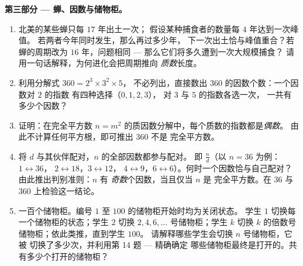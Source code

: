 \begin{problem}
\medskip
\noindent\textbf{第三部分 --- 蝉、因数与储物柜。}
\begin{enumerate}[resume]
  \item 北美的某些蝉只每 $17$ 年出土一次；
        假设某种捕食者的数量每 $4$ 年达到一次峰值。
        若两者今年同时发生，那么再过多少年，
        下一次出土恰与峰值重合？若蝉的周期改为 $16$ 年，问题相同 ---
        那么它们将多久遭到一次大规模捕食？
        请用一句话解释，为何进化会把周期推向
        \emph{质数}长度。
  \item 利用分解式 $360 = 2^3 \times 3^2 \times 5$，
        不必列出，直接数出 $360$ 的因数个数：一个因数对 $2$ 的指数
        有四种选择（$0, 1, 2, 3$），
        对 $3$ 与 $5$ 的指数各选一次，
        一共有多少个因数？
  \item 证明：在完全平方数
        $n = m^2$ 的质因数分解中，每个质数的指数都是\emph{偶数}。
        由此不计算任何平方根，即可推出 $360$ 不是
        完全平方数。
  \item 将 $d$ 与其伙伴配对，$n$ 的全部因数都参与配对。
        即 $\frac{n}{d}$（以 $n = 36$ 为例：$1 \leftrightarrow 36$，
        $2 \leftrightarrow 18$，$3 \leftrightarrow 12$，
        $4 \leftrightarrow 9$，$6 \leftrightarrow 6$）。何时一个因数恰与自己配对？
        由此推出判别准则：$n$ 有
        \emph{奇数}个因数，当且仅当 $n$ 是
        完全平方数。在 $36$ 与 $360$ 上检验这一结论。
  \item 一百个储物柜。编号 $1$ 至 $100$ 的储物柜开始时均为关闭状态。
        学生 $1$ 切换每一个储物柜的状态；学生 $2$ 切换
        $2, 4, 6, \dots$ 号储物柜；学生 $k$ 切换
        $k$ 的倍数号储物柜；依此类推，直到学生 $100$。
        请解释哪些学生会切换 $n$ 号储物柜，它被
        切换了多少次，并利用第 14 题 --- 精确确定
        哪些储物柜最终是打开的。共有多少个打开的储物柜？
\end{enumerate}
\end{problem}
